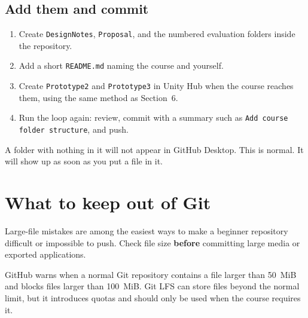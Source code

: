 \documentclass[11pt,a4paper]{article}
\newcommand{\pathbit}[1]{\texttt{#1}}
\begin{document}
\subsection{Add them and commit}
\begin{enumerate}
\item Create \pathbit{DesignNotes}, \pathbit{Proposal}, and the numbered evaluation
folders inside the repository.
\item Add a short \pathbit{README.md} naming the course and yourself.
\item Create \pathbit{Prototype2} and \pathbit{Prototype3} in Unity Hub when the course
reaches them, using the same method as Section~6.
\item Run the loop again: review, commit with a summary such as
\texttt{Add course folder structure}, and push.
\end{enumerate}

\begin{plainbox}
A folder with nothing in it will not appear in GitHub Desktop. This is normal. It will
show up as soon as you put a file in it.
\end{plainbox}

\section{What to keep out of Git}

Large-file mistakes are among the easiest ways to make a beginner repository difficult or
impossible to push. Check file size \textbf{before} committing large media or exported
applications.

\begin{warnbox}
GitHub warns when a normal Git repository contains a file larger than 50~MiB and blocks
files larger than 100~MiB. Git LFS can store files beyond the normal limit, but it
introduces quotas and should only be used when the course requires it.
\end{warnbox}
\end{document}
